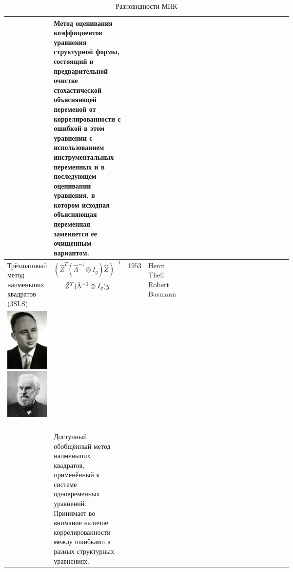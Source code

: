 \documentclass[10pt,a4paper]{article}
\begin{document}
\begin{table}
\begin{tabular}{|m{0.066\linewidth}|m{.11\linewidth}|m{.065\linewidth}|m{.05\linewidth}|m{0.205\linewidth}|m{0.412\linewidth}|}
\begin{minipage}[t]{\linewidth}
\end{minipage} &  Метод оценивания коэффициентов уравнения структурной формы, состоящий в предварительной очистке стохастической объясняющей переменой от коррелированности с ошибкой в этом уравнении с использованием инструментальных переменных и в последующем оценивании уравнения, в котором исходная объясняющая переменная заменяется ее очищенным вариантом. \\
\hline
Трёхшаговый метод наименьших квадратов (3SLS) & $$(\hat Z^T(\hat \Lambda^{-1} \otimes I_g) \hat Z)^{-1}$$ \-
 $$\hat Z^T \newline(\hat \Lambda^{-1} \otimes I_g)y$$ & 1953 \newline   1957 &  Henri Theil \newline Robert Basmann &  
\begin{minipage}[t]{\linewidth} \centering \ \\
\includegraphics[width=0.24\linewidth]{apf1-08280t.jpg}\hfill \includegraphics[width=0.3\linewidth]{AdonijahWelch.jpg}\ \\
\end{minipage}
 & Доступный обобщённый метод наименьших квадратов, применённый к системе одновременных уравнений. Принимает во внимание наличие коррелированности между ошибками в разных структурных уравнениях. \\
\hline

\end{tabular}
\caption{Разновидности МНК}
\end{table}
\end{document}
